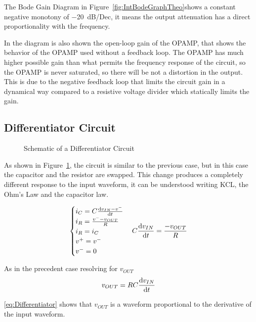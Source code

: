 \documentclass[a4paper, twocolumn]{article}
\begin{document}
The Bode Gain Diagram in Figure~\ref{fig:IntBodeGraphTheo}shows a constant negative monotony of \SI{-20}{\deci\bel/Dec}, it means the output attenuation has a direct proportionality with the frequency.

In the diagram is also shown the open-loop gain of the OPAMP, that shows the behavior of the OPAMP used without a feedback loop. The OPAMP has much higher possible gain than what permits the frequency response of the circuit, so the OPAMP is never saturated, so there will be not a distortion in the output. This is due to the negative feedback loop that limits the circuit gain in a dynamical way compared to a resistive voltage divider which statically limits the gain.

\subsection{Differentiator Circuit} 
\label{sec:diff}

\begin{figure}
    \centering
    \def \svgwidht{\columnwidth}
    
    \caption{Schematic of a Differentiator Circuit}
    \label{fig:DifferScheme}
\end{figure}

As shown in Figure~\ref{fig:DifferScheme}, the circuit is similar to the previous case, but in this case the capacitor and the resistor are swapped. This change produces a completely different response to the input waveform, it can be understood writing KCL, the Ohm's Law and the capacitor law.

\begin{gather*}
    \begin{cases}
        i_C = C\dv{v_{IN}-v^-}{t}\\
        i_R = \frac{v^--v_{OUT}}{R}\\
        i_R = i_C\\
        v^+=v^-\\
        v^-=0
    \end{cases}
    C\dv{v_{IN}}{t}=\frac{-v_{OUT}}{R}
\end{gather*}

As in the precedent case resolving for $v_{OUT}$
\begin{equation}
    \label{eq:Differentiator}
    v_{OUT}=RC\dv{v_{IN}}{t}
\end{equation}

\eqref{eq:Differentiator} shows that $v_{OUT}$ is a waveform proportional to the derivative of the input waveform. 
\end{document}
